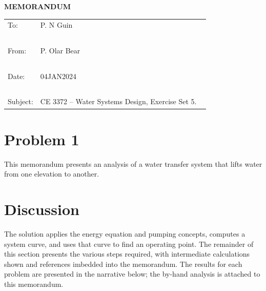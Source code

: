 \documentclass[12pt]{article}
\begin{document}
\begin{center}
\textbf{MEMORANDUM}
\end{center}
\begingroup
\begin{tabular}{p{1in} p{5in}}
To: & P. N Guin \\ ~\\
From: & P. Olar Bear \\ ~\\
Date: & 04JAN2024 \\ ~\\
Subject: & CE 3372 -- Water Systems Design, Exercise Set 5. ~\\
\end{tabular}
\endgroup

\section*{\small{Problem 1}}  
This memorandum presents an analysis of a water transfer system that lifts water from one elevation to another.

\section*{\small{Discussion}}
The solution applies the energy equation and pumping concepts, computes a system curve, and uses that curve to find an operating point.
The remainder of this section presents the various steps required, with intermediate calculations shown and references imbedded into the memorandum.
The results for each problem are presented in the narrative below; the by-hand analysis is attached to this memorandum.
\end{document}
